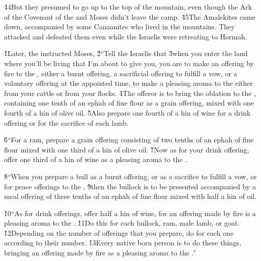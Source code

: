 \v{44}But they presumed to go up to the top of the mountain, even though the Ark of the Covenant of the  and Moses didn't leave the camp. \v{45}The Amalekites came down, accompanied by some Canaanites who lived in the mountains. They attacked and defeated them even while the Israelis were retreating to Hormah.

\v{1}Later, the  instructed Moses, \v{2}``Tell the Israelis that \v{3}when you enter the land where you'll be living that I'm about to give you, you are to make an offering by fire to the , either a burnt offering, a sacrificial offering to fulfill a vow, or a voluntary offering at the appointed time, to make a pleasing aroma to the  either from your cattle or from your flocks. \v{4}The offeror is to bring the oblation to the , containing one tenth of an ephah of fine flour as a grain offering, mixed with one fourth of a hin of olive oil. \v{5}Also prepare one fourth of a hin of wine for a drink offering or for the sacrifice of each lamb.

\v{6}``For a ram, prepare a grain offering consisting of two tenths of an ephah of fine flour mixed with one third of a hin of olive oil. \v{7}Now as for your drink offering, offer one third of a hin of wine as a pleasing aroma to the .

\v{8}``When you prepare a bull as a burnt offering, or as a sacrifice to fulfill a vow, or for peace offerings to the , \v{9}then the bullock is to be presented accompanied by a meal offering of three tenths of an ephah of fine flour mixed with half a hin of oil.

\v{10}``As for drink offerings, offer half a hin of wine, for an offering made by fire is a pleasing aroma to the . \v{11}Do this for each bullock, ram, male lamb, or goat. \v{12}Depending on the number of offerings that you prepare, do for each one according to their number. \v{13}Every native born person is to do these things, bringing an offering made by fire as a pleasing aroma to the .''

